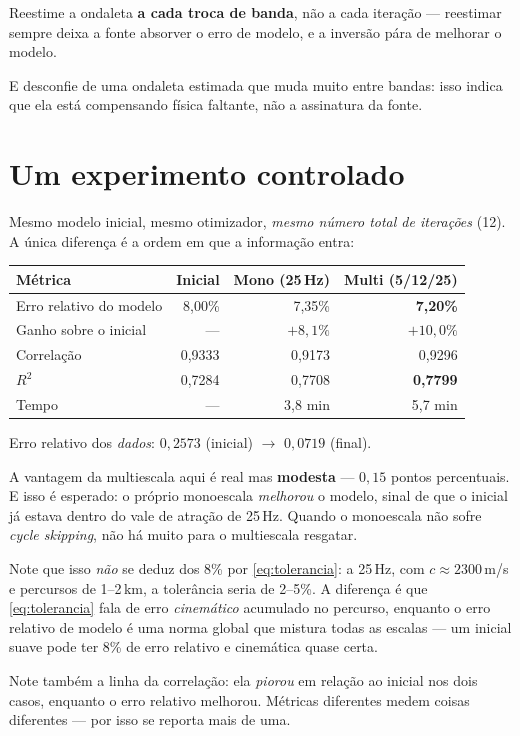 \documentclass[11pt,a4paper,oneside]{report}
\begin{document}
\begin{pratica}
Reestime a ondaleta \textbf{a cada troca de banda}, n\~ao a cada itera\c{c}\~ao
--- reestimar sempre deixa a fonte absorver o erro de modelo, e a invers\~ao
p\'ara de melhorar o modelo.

E desconfie de uma ondaleta estimada que muda muito entre bandas: isso indica
que ela est\'a compensando f\'isica faltante, n\~ao a assinatura da fonte.
\end{pratica}

\section{Um experimento controlado}

Mesmo modelo inicial, mesmo otimizador, \emph{mesmo n\'umero total de
itera\c{c}\~oes} (12). A \'unica diferen\c{c}a \'e a ordem em que a
informa\c{c}\~ao entra:

\begin{center}
\begin{tabular}{@{}lrrr@{}}
\toprule
\textbf{M\'etrica} & \textbf{Inicial} & \textbf{Mono (25\,Hz)}
& \textbf{Multi (5/12/25)} \\
\midrule
Erro relativo do modelo & 8{,}00\% & 7{,}35\% & \textbf{7{,}20\%} \\
Ganho sobre o inicial & --- & $+8{,}1\%$ & $+10{,}0\%$ \\
Correla\c{c}\~ao & 0{,}9333 & 0{,}9173 & 0{,}9296 \\
$R^{2}$ & 0{,}7284 & 0{,}7708 & \textbf{0{,}7799} \\
Tempo & --- & 3{,}8 min & 5{,}7 min \\
\bottomrule
\end{tabular}
\end{center}

Erro relativo dos \emph{dados}: $0{,}2573$ (inicial) $\to$ $0{,}0719$ (final).

\begin{atencao}
A vantagem da multiescala aqui \'e real mas \textbf{modesta} --- $0{,}15$
pontos percentuais. E isso \'e esperado: o pr\'oprio monoescala
\emph{melhorou} o modelo, sinal de que o inicial j\'a estava dentro do vale de
atra\c{c}\~ao de 25\,Hz. Quando o monoescala n\~ao sofre \emph{cycle
skipping}, n\~ao h\'a muito para o multiescala resgatar.

Note que isso \emph{n\~ao} se deduz dos 8\% por \eqref{eq:tolerancia}: a 25\,Hz,
com $c \approx 2300$\,m/s e percursos de 1--2\,km, a toler\^ancia seria de
2--5\%. A diferen\c{c}a \'e que \eqref{eq:tolerancia} fala de erro
\emph{cinem\'atico} acumulado no percurso, enquanto o erro relativo de modelo
\'e uma norma global que mistura todas as escalas --- um inicial suave pode ter
8\% de erro relativo e cinem\'atica quase certa.

Note tamb\'em a linha da correla\c{c}\~ao: ela \emph{piorou} em rela\c{c}\~ao
ao inicial nos dois casos, enquanto o erro relativo melhorou. M\'etricas
diferentes medem coisas diferentes --- por isso se reporta mais de uma.
\end{atencao}
\end{document}
